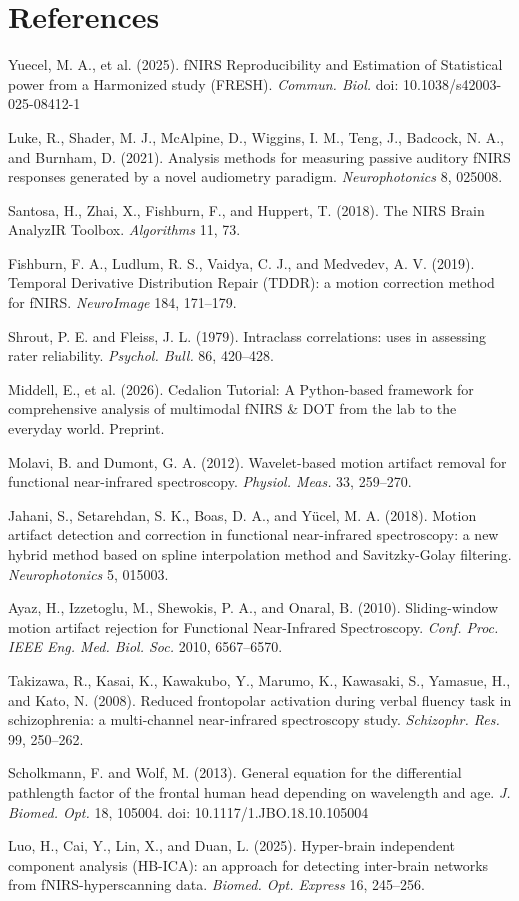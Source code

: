 \documentclass[11pt]{article}
\begin{document}
\section*{References}

{\small
Yuecel, M. A., et al. (2025). fNIRS Reproducibility and Estimation of Statistical power from a Harmonized study (FRESH). \textit{Commun. Biol.} doi: 10.1038/s42003-025-08412-1

Luke, R., Shader, M. J., McAlpine, D., Wiggins, I. M., Teng, J., Badcock, N. A., and Burnham, D. (2021). Analysis methods for measuring passive auditory fNIRS responses generated by a novel audiometry paradigm. \textit{Neurophotonics} 8, 025008.

Santosa, H., Zhai, X., Fishburn, F., and Huppert, T. (2018). The NIRS Brain AnalyzIR Toolbox. \textit{Algorithms} 11, 73.

Fishburn, F. A., Ludlum, R. S., Vaidya, C. J., and Medvedev, A. V. (2019). Temporal Derivative Distribution Repair (TDDR): a motion correction method for fNIRS. \textit{NeuroImage} 184, 171--179.

Shrout, P. E. and Fleiss, J. L. (1979). Intraclass correlations: uses in assessing rater reliability. \textit{Psychol. Bull.} 86, 420--428.

Middell, E., et al. (2026). Cedalion Tutorial: A Python-based framework for comprehensive analysis of multimodal fNIRS \& DOT from the lab to the everyday world. Preprint.

Molavi, B. and Dumont, G. A. (2012). Wavelet-based motion artifact removal for functional near-infrared spectroscopy. \textit{Physiol. Meas.} 33, 259--270.

Jahani, S., Setarehdan, S. K., Boas, D. A., and Y\"ucel, M. A. (2018). Motion artifact detection and correction in functional near-infrared spectroscopy: a new hybrid method based on spline interpolation method and Savitzky-Golay filtering. \textit{Neurophotonics} 5, 015003.

Ayaz, H., Izzetoglu, M., Shewokis, P. A., and Onaral, B. (2010). Sliding-window motion artifact rejection for Functional Near-Infrared Spectroscopy. \textit{Conf. Proc. IEEE Eng. Med. Biol. Soc.} 2010, 6567--6570.

Takizawa, R., Kasai, K., Kawakubo, Y., Marumo, K., Kawasaki, S., Yamasue, H., and Kato, N. (2008). Reduced frontopolar activation during verbal fluency task in schizophrenia: a multi-channel near-infrared spectroscopy study. \textit{Schizophr. Res.} 99, 250--262.

Scholkmann, F. and Wolf, M. (2013). General equation for the differential pathlength factor of the frontal human head depending on wavelength and age. \textit{J. Biomed. Opt.} 18, 105004. doi: 10.1117/1.JBO.18.10.105004

Luo, H., Cai, Y., Lin, X., and Duan, L. (2025). Hyper-brain independent component analysis (HB-ICA): an approach for detecting inter-brain networks from fNIRS-hyperscanning data. \textit{Biomed. Opt. Express} 16, 245--256.
}
\end{document}
